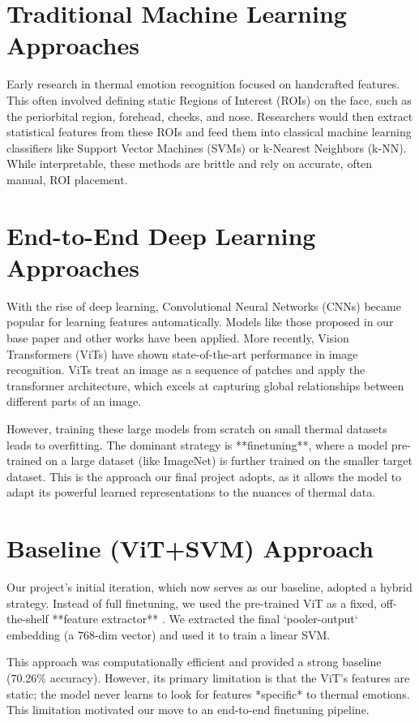 \documentclass[12pt,a4paper]{report}
\begin{document}
\section{Traditional Machine Learning Approaches}
Early research in thermal emotion recognition focused on handcrafted features. This often involved defining static Regions of Interest (ROIs) on the face, such as the periorbital region, forehead, cheeks, and nose. Researchers would then extract statistical features from these ROIs and feed them into classical machine learning classifiers like Support Vector Machines (SVMs) \cite{svm} or k-Nearest Neighbors (k-NN). While interpretable, these methods are brittle and rely on accurate, often manual, ROI placement.

\section{End-to-End Deep Learning Approaches}
With the rise of deep learning, Convolutional Neural Networks (CNNs) became popular for learning features automatically. Models like those proposed in our base paper \cite{base_paper} and other works \cite{base_paper_1} have been applied. More recently, Vision Transformers (ViTs) \cite{vit} have shown state-of-the-art performance in image recognition. ViTs treat an image as a sequence of patches and apply the transformer architecture, which excels at capturing global relationships between different parts of an image.

However, training these large models from scratch on small thermal datasets leads to overfitting. The dominant strategy is **finetuning**, where a model pre-trained on a large dataset (like ImageNet) is further trained on the smaller target dataset. This is the approach our final project adopts, as it allows the model to adapt its powerful learned representations to the nuances of thermal data.

\section{Baseline (ViT+SVM) Approach}
Our project's initial iteration, which now serves as our baseline, adopted a hybrid strategy. Instead of full finetuning, we used the pre-trained ViT as a fixed, off-the-shelf **feature extractor** \cite{huggingface_vit}. We extracted the final `pooler-output` embedding (a 768-dim vector) and used it to train a linear SVM.

This approach was computationally efficient and provided a strong baseline (70.26\% accuracy). However, its primary limitation is that the ViT's features are static; the model never learns to look for features *specific* to thermal emotions. This limitation motivated our move to an end-to-end finetuning pipeline.
\end{document}
